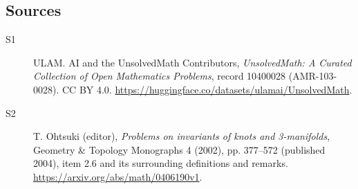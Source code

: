 \documentclass[11pt]{article}
\begin{document}
\subsection{Sources}
\begin{description}
\item[\hypertarget{source:10400028:1}{S1}] ULAM. AI and the UnsolvedMath Contributors, \emph{UnsolvedMath: A Curated Collection of Open Mathematics Problems}, record 10400028 (AMR-103-0028). CC BY 4.0. \url{https://huggingface.co/datasets/ulamai/UnsolvedMath}.
\item[\hypertarget{source:10400028:2}{S2}] T. Ohtsuki (editor), \emph{Problems on invariants of knots and 3-manifolds}, Geometry \& Topology Monographs 4 (2002), pp. 377--572 (published 2004), item 2.6 and its surrounding definitions and remarks. \url{https://arxiv.org/abs/math/0406190v1}.
\end{description}
\label{end:10400028}
\end{document}
